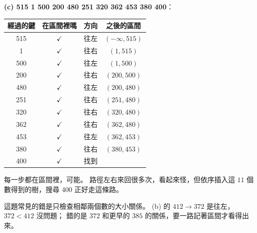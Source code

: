 \begin{pastsoln}
\textbf{(c) 515 1 500 200 480 251 320 362 453 380 400}：
\begin{center}
\small
\begin{tabular}{cccc}
\toprule
經過的鍵 & 在區間裡嗎 & 方向 & 之後的區間 \\
\midrule
515 & $\checkmark$ & 往左 & $(-\infty, 515)$ \\
1 & $\checkmark$ & 往右 & $(1, 515)$ \\
500 & $\checkmark$ & 往左 & $(1, 500)$ \\
200 & $\checkmark$ & 往右 & $(200, 500)$ \\
480 & $\checkmark$ & 往左 & $(200, 480)$ \\
251 & $\checkmark$ & 往右 & $(251, 480)$ \\
320 & $\checkmark$ & 往右 & $(320, 480)$ \\
362 & $\checkmark$ & 往右 & $(362, 480)$ \\
453 & $\checkmark$ & 往左 & $(362, 453)$ \\
380 & $\checkmark$ & 往右 & $(380, 453)$ \\
400 & $\checkmark$ & 找到 & \\
\bottomrule
\end{tabular}
\end{center}
每一步都在區間裡，可能。 路徑左右來回很多次，看起來怪，但依序插入這 $11$ 個數得到的樹，搜尋
$400$ 正好走這條路。

這題常見的錯是只檢查相鄰兩個數的大小關係。 (b) 的 $412 \to 372$ 是往左，$372 < 412$ 沒問題；
錯的是 $372$ 和更早的 $385$ 的關係，要一路記著區間才看得出來。
\end{pastsoln}
